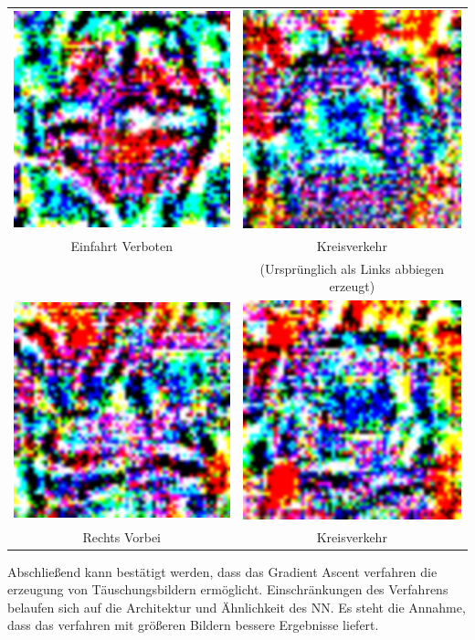 \begin{tabular}{cc}
	\centering
	\includegraphics[width=.23\linewidth]{Images/AnPe/17_Einfahrtverbot} &\includegraphics[width=.23\linewidth]{Images/AnPe/34_kreisverkehr_origTurnleft}  \\
	Einfahrt Verboten & Kreisverkehr \\
	& (Ursprünglich als Links abbiegen erzeugt)\\
	\includegraphics[width=.23\linewidth]{Images/AnPe/39_RechtsVorbeiOrigLinksvorbei} &\includegraphics[width=.23\linewidth]{Images/AnPe/40_kreisverkehr}  \\
	Rechts Vorbei& Kreisverkehr\\
\end{tabular}

Abschließend kann bestätigt werden, dass das Gradient Ascent verfahren die erzeugung von Täuschungsbildern ermöglicht. Einschränkungen des Verfahrens belaufen sich auf die Architektur und Ähnlichkeit des NN. Es steht die Annahme, dass das verfahren mit größeren Bildern bessere Ergebnisse liefert.